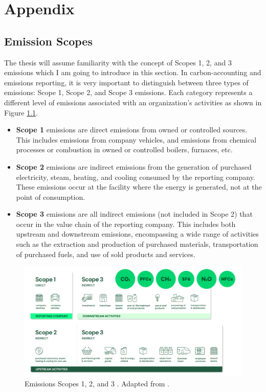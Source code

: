 \chapter{Appendix}
\label{AppendixA}

\section{Emission Scopes}
\label{sec:emission_scopes}
The thesis will assume familiarity with the concept of Scopes 1, 2, and 3 emissions which I am going to introduce in this section. In carbon-accounting and emissions reporting, it is very important to distinguish between three types of emissions: Scope 1, Scope 2, and Scope 3 emissions. Each category represents a different level of emissions associated with an organization's activities as shown in Figure \ref{fig:emission_scopes}.

\begin{itemize}
    \item \textbf{Scope 1} emissions are direct emissions from owned or controlled sources. This includes emissions from company vehicles, and emissions from chemical processes or combustion in owned or controlled boilers, furnaces, etc.
    \item \textbf{Scope 2} emissions are indirect emissions from the generation of purchased electricity, steam, heating, and cooling consumed by the reporting company. These emissions occur at the facility where the energy is generated, not at the point of consumption.
    \item \textbf{Scope 3} emissions are all indirect emissions (not included in Scope 2) that occur in the value chain of the reporting company. This includes both upstream and downstream emissions, encompassing a wide range of activities such as the extraction and production of purchased materials, transportation of purchased fuels, and use of sold products and services.
\end{itemize}

\begin{figure}[h]
    \centering
    \includegraphics[width=1\textwidth]{figures/emission_scopes.png}
    \caption{Emissions Scopes 1, 2, and 3 . Adapted from \cite{Bernoville2022Scopes}.}
    \label{fig:emission_scopes}
\end{figure}

